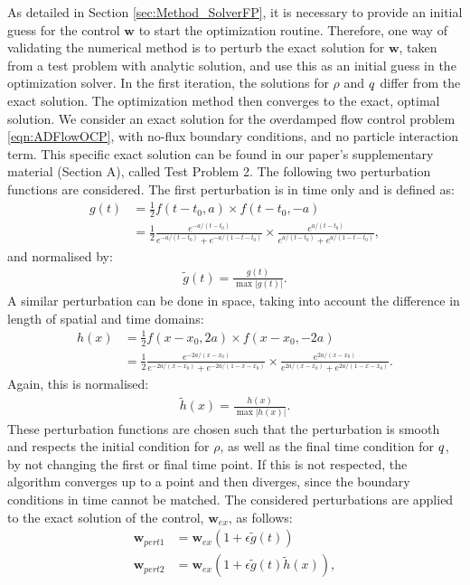 
As detailed in Section \ref{sec:Method_SolverFP}, it is necessary to provide an initial guess for the control $\mathbf{w}$ to start the optimization routine. Therefore, one way of validating the numerical method is to perturb the exact solution for $\mathbf{w}$, taken from a test problem with analytic solution, and use this as an initial guess in the optimization solver. In the first iteration, the solutions for $\rho$ and $q$ differ from the exact solution. The optimization method then converges to the exact, optimal solution. We consider an exact solution for the overdamped flow control problem \eqref{eqn:ADFlowOCP}, with no-flux boundary conditions, and no particle interaction term. This specific exact solution can be found in our paper's supplementary material (Section A), called Test Problem 2. 
The following two perturbation functions are considered. The first perturbation is in time only and is defined as:
\begin{align*}
g(t) &= \frac{1}{2} f(t-t_0, a) \times f(t-t_0, -a)\\
&= \frac{1}{2} \frac{e^{-a/(t-t_0)}}{e^{-a/(t-t_0)} + e^{-a/(1-t -t_0)}} \times \frac{e^{a/(t-t_0)}}{e^{a/(t-t_0)} + e^{a/(1-t - t_0)}},
\end{align*}
and normalised by:
\begin{align*}
\tilde g(t) = \frac{g(t)}{\max{|{g(t)}|}}.
\end{align*}
A similar perturbation can be done in space, taking into account the difference in length of spatial and time domains:
\begin{align*}
h(x) &= \frac{1}{2} f(x-x_0, 2a) \times f(x-x_0, -2a)\\
&= \frac{1}{2} \frac{e^{-2a/(x-x_0)}}{e^{-2a/(x-x_0)} + e^{-2a/(1-x-x_0)}} \times \frac{e^{2a/(x-x_0)}}{e^{2a/(x-x_0)} + e^{2a/(1-x-x_0)}}.
\end{align*}
Again, this is normalised:
\begin{align*}
\tilde h(x) = \frac{h(x)}{\max{|{h(x)}|}}.
\end{align*}
These perturbation functions are chosen such that the perturbation is smooth and respects the initial condition for $\rho$, as well as the final time condition for $q$, by not changing the first or final time point. If this is not respected, the algorithm converges up to a point and then diverges, since the boundary conditions in time cannot be matched.
The considered perturbations are applied to the exact solution of the control, $\mathbf{w}_{ex}$, as follows:
\begin{align*}
\mathbf{w}_{pert1} &= \mathbf{w}_{ex}(1+ \epsilon \tilde g(t))\\
\mathbf{w}_{pert2} &= \mathbf{w}_{ex}(1+ \epsilon \tilde g(t) \tilde h(x)),
\end{align*}
